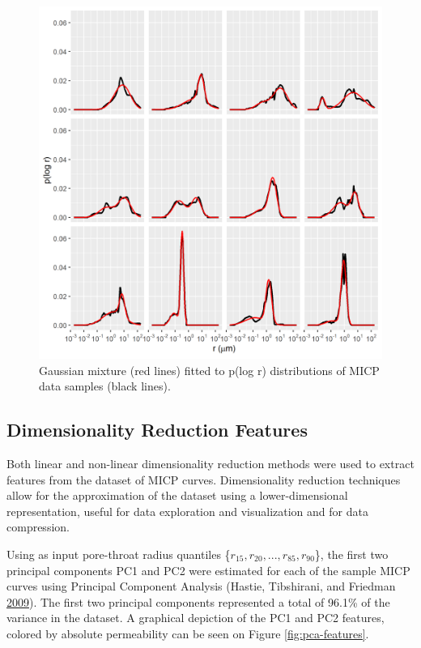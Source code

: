 \documentclass[english,msc,numbers]{coppe}
\begin{document}
  \begin{figure}
  
  {\centering \includegraphics[width=0.75\linewidth]{figure/3-3-pchg-gauss-mixture-2} 
  
  }
  
  \caption{Gaussian mixture (red lines) fitted to p(log r) distributions of MICP data samples (black lines).}\label{fig:gauss-mixture-2}
  \end{figure}
  \hypertarget{dimensionality-reduction-features}{%
  \subsection{Dimensionality Reduction Features}\label{dimensionality-reduction-features}}
  
  Both linear and non-linear dimensionality reduction methods were used to extract features from the dataset of MICP curves. Dimensionality reduction techniques allow for the approximation of the dataset using a lower-dimensional representation, useful for data exploration and visualization and for data compression.
  
  Using as input pore-throat radius quantiles \{\(r_{15},r_{20},...,r_{85},r_{90}\)\}, the first two principal components PC1 and PC2 were estimated for each of the sample MICP curves using Principal Component Analysis (Hastie, Tibshirani, and Friedman \protect\hyperlink{ref-Hastie2009}{2009}). The first two principal components represented a total of 96.1\% of the variance in the dataset. A graphical depiction of the PC1 and PC2 features, colored by absolute permeability can be seen on Figure \ref{fig:pca-features}.
  
\end{document}
